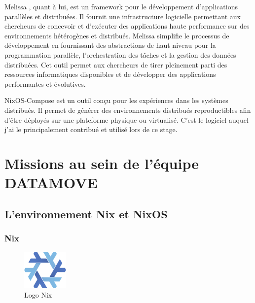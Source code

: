 \documentclass[a4paper,french,12pt, titlepage]{article}
\begin{document}
Melissa \cite{melissa2017}, quant à lui, est un framework pour le
développement d'applications parallèles et distribuées. Il fournit une
infrastructure logicielle permettant aux chercheurs de concevoir et
d'exécuter des applications haute performance sur des environnements
hétérogènes et distribués. Melissa simplifie le processus de
développement en fournissant des abstractions de haut niveau pour la
programmation parallèle, l'orchestration des tâches et la gestion des
données distribuées. Cet outil permet aux chercheurs de tirer pleinement
parti des ressources informatiques disponibles et de développer des
applications performantes et évolutives.\newline

NixOS-Compose est un outil conçu pour les expériences dans les systèmes
distribués. Il permet de générer des environnements distribués
reproductibles afin d'être déployés sur une plateforme physique ou
virtualisé. C'est le logiciel auquel j'ai le principalement contribué et
utilisé lors de ce stage.

\newpage

\hypertarget{missions-au-sein-de-luxe9quipe-datamove}{%
\section{Missions au sein de l'équipe
DATAMOVE}\label{missions-au-sein-de-luxe9quipe-datamove}}

\hypertarget{lenvironnement-nix-et-nixos}{%
\subsection{L'environnement Nix et
NixOS}\label{lenvironnement-nix-et-nixos}}

\hypertarget{nix}{%
\subsubsection{Nix}\label{nix}}

\begin{figure}[h]
\centering
\includegraphics[width=0.2\textwidth,height=0.2\textheight,keepaspectratio]{logos/nixlogo.png}
\caption{Logo Nix}
\end{figure}
\end{document}
